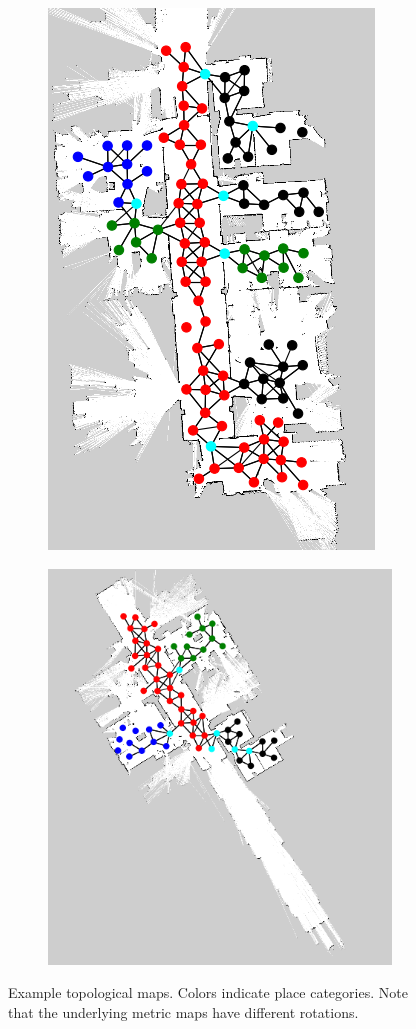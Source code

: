 \documentclass[10pt, titlepage]{article}
\theoremstyle{definition}
\begin{document}
\begin{figure}[!htb]
  \centering
  \begin{subfigure}{.4\textwidth}
  \centering
  \includegraphics[width=.5\linewidth]{images/Freiburg1}
  \label{fig:sfig1}
\end{subfigure}%
\begin{subfigure}{.4\textwidth}
  \centering
  \includegraphics[width=.7\linewidth]{images/Freiburg2}
  \label{fig:sfig2}
\end{subfigure}
\captionsetup{width=.8\linewidth}
\caption{Example topological maps. Colors indicate place categories. Note that the underlying metric maps have different rotations.}
\end{figure}
\end{document}
